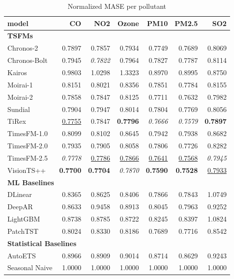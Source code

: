 \begin{table}[H]
\caption{Normalized MASE per pollutant}
\centering
\begin{small}
\begin{tabular}{lrrrrrr}
\toprule
model & CO & NO2 & Ozone & PM10 & PM2.5 & SO2 \\
\midrule
\multicolumn{7}{l}{\textbf{TSFMs}} \\
Chronos-2 & 0.7897 & 0.7857 & 0.7934 & 0.7749 & 0.7689 & 0.8069 \\
Chronos-Bolt & 0.7945 & \textit{0.7822} & 0.7964 & 0.7827 & 0.7787 & 0.8114 \\
Kairos & 0.9803 & 1.0298 & 1.3323 & 0.8970 & 0.8995 & 0.8750 \\
Moirai-1 & 0.8151 & 0.8021 & 0.8356 & 0.7851 & 0.7784 & 0.8155 \\
Moirai-2 & 0.7858 & 0.7847 & 0.8125 & 0.7711 & 0.7632 & 0.7982 \\
Sundial & 0.7904 & 0.7947 & 0.8014 & 0.7804 & 0.7769 & 0.8056 \\
TiRex & \underline{0.7755} & 0.7847 & \textbf{0.7796} & \textit{0.7666} & \textit{0.7579} & \textbf{0.7897} \\
TimesFM-1.0 & 0.8099 & 0.8102 & 0.8645 & 0.7942 & 0.7938 & 0.8682 \\
TimesFM-2.0 & 0.7935 & 0.7905 & 0.8058 & 0.7806 & 0.7726 & 0.8282 \\
TimesFM-2.5 & \textit{0.7778} & \underline{0.7786} & \underline{0.7866} & \underline{0.7641} & \underline{0.7568} & \textit{0.7945} \\
VisionTS++ & \textbf{0.7700} & \textbf{0.7704} & \textit{0.7870} & \textbf{0.7590} & \textbf{0.7528} & \underline{0.7933} \\
\midrule
\multicolumn{7}{l}{\textbf{ML Baselines}} \\
DLinear & 0.8365 & 0.8625 & 0.8406 & 0.7866 & 0.7843 & 1.0749 \\
DeepAR & 0.8633 & 0.9458 & 0.8913 & 0.8045 & 0.7963 & 0.9252 \\
LightGBM & 0.8738 & 0.8785 & 0.8722 & 0.8245 & 0.8397 & 1.0824 \\
PatchTST & 0.8024 & 0.8330 & 0.8186 & 0.7689 & 0.7716 & 0.8542 \\
\midrule
\multicolumn{7}{l}{\textbf{Statistical Baselines}} \\
AutoETS & 0.8966 & 0.8909 & 0.9014 & 0.8714 & 0.8629 & 0.9243 \\
Seasonal Naive & 1.0000 & 1.0000 & 1.0000 & 1.0000 & 1.0000 & 1.0000 \\
\bottomrule
\end{tabular}
\end{small}
\end{table}